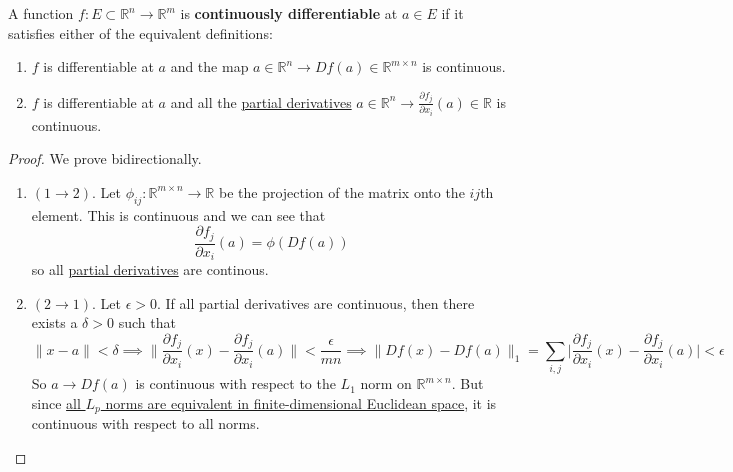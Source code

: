 	\begin{definition}
	  \label{def:continuously-differentiable}
		A function $f: E \subset \mathbb{R}^n \to \mathbb{R}^m$ is \textbf{continuously differentiable} at $a \in E$ if it satisfies either of the equivalent definitions: 
		\begin{enumerate}
			\item $f$ is differentiable at $a$ and the map $a \in \mathbb{R}^n \to Df(a) \in \mathbb{R}^{m \times n}$ is continuous. 
			\item $f$ is differentiable at $a$ and all the \hyperref[def:partial-derivative]{partial derivatives} $a \in \mathbb{R}^n \to \frac{\partial f_j}{\partial x_i} (a) \in \mathbb{R}$ is continuous. 
		\end{enumerate}
	\end{definition}
	\begin{proof}
	  We prove bidirectionally. 
		\begin{enumerate}
			\item $(1 \to 2)$. Let $\phi_{ij} : \mathbb{R}^{m \times n} \to \mathbb{R}$ be the projection of the matrix onto the $ij$th element. This is continuous and we can see that 
				\begin{equation}
					\frac{\partial f_j}{\partial x_i} (a) = \phi(Df(a))
				\end{equation}
				so all \hyperref[def:partial-derivative]{partial derivatives} are continous. 

			\item $(2 \to 1)$. Let $\epsilon > 0$. If all partial derivatives are continuous, then there exists a $\delta > 0$ such that 
				\begin{equation}
					\|x - a\| < \delta \implies \bigg\| \frac{\partial f_j}{\partial x_i} (x) - \frac{\partial f_j}{\partial x_i} (a) \bigg\| < \frac{\epsilon}{mn} \implies \|Df(x) - Df(a)\|_1 = \sum_{i, j} \bigg| \frac{\partial f_j}{\partial x_i} (x) - \frac{\partial f_j}{\partial x_i} (a) \bigg| < \epsilon
				\end{equation}
				So $a \to Df(a)$ is continuous with respect to the $L_1$ norm on $\mathbb{R}^{m \times n}$. But since \hyperref[pst-thm:lp-norms-euclidean-topology]{all $L_p$ norms are equivalent in finite-dimensional Euclidean space}, it is continuous with respect to all norms. 
		\end{enumerate}
	\end{proof}

